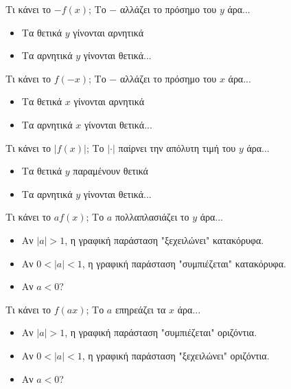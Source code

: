 \documentclass{presentation}
\begin{document}
\begin{frame}{Τι κάνει το $-f(x)$;}
  Το $-$ αλλάζει το πρόσημο του $y$ άρα...

  \begin{itemize}[<+->]
    \item<2-> Τα θετικά $y$ γίνονται αρνητικά
    \item<3-> Τα αρνητικά $y$ γίνονται θετικά...
  \end{itemize}
\end{frame}

\begin{frame}{Τι κάνει το $f(-x)$;}
  Το $-$ αλλάζει το πρόσημο του $x$ άρα...

  \begin{itemize}[<+->]
    \item<2-> Τα θετικά $x$ γίνονται αρνητικά
    \item<3-> Τα αρνητικά $x$ γίνονται θετικά...
  \end{itemize}
\end{frame}

\begin{frame}{Τι κάνει το $|f(x)|$;}
  Το $| \cdot |$ παίρνει την απόλυτη τιμή του $y$ άρα...

  \begin{itemize}[<+->]
    \item<2-> Τα θετικά $y$ παραμένουν θετικά
    \item<3-> Τα αρνητικά $y$ γίνονται θετικά...
  \end{itemize}
\end{frame}

\begin{frame}{Τι κάνει το $a f(x)$;}
  Το $a$ πολλαπλασιάζει το $y$ άρα...

  \begin{itemize}[<+->]
    \item<2-> Αν $|a|>1$, η γραφική παράσταση "ξεχειλώνει" κατακόρυφα.
    \item<3-> Αν $0<|a|<1$, η γραφική παράσταση "συμπιέζεται" κατακόρυφα.
    \item<4-> Αν $a<0$?
  \end{itemize}
\end{frame}

\begin{frame}{Τι κάνει το $f(a x)$;}
  Το $a$ επηρεάζει τα $x$ άρα...

  \begin{itemize}[<+->]
    \item<2-> Αν $|a|>1$, η γραφική παράσταση "συμπιέζεται" οριζόντια.
    \item<3-> Αν $0<|a|<1$, η γραφική παράσταση "ξεχειλώνει" οριζόντια.
    \item<4-> Αν $a<0$?
  \end{itemize}
\end{frame}
\end{document}
